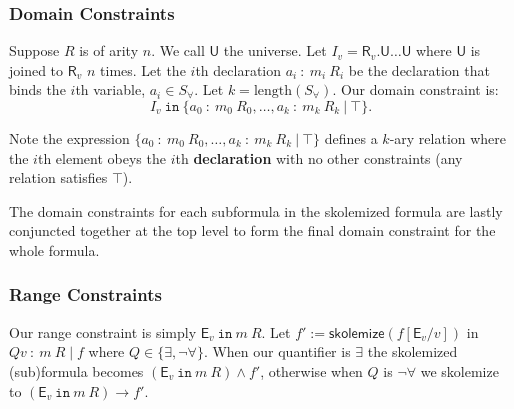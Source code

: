 \documentclass{article}
\theoremstyle{definition}
\begin{document}
    \subsubsection*{Domain Constraints}

    Suppose $R$ is of arity $n$. We call $\textsf{U}$ the universe. Let $I_v = \textsf{R}_v.\textsf{U} \dots \textsf{U}$ where $\textsf{U}$ is joined to $\textsf{R}_v$ $n$ times. Let the $i$th declaration $a_i~:~m_i~R_i$ be the declaration that binds the $i$th variable, $a_i \in S_\forall$. Let $k = \text{length}(S_\forall)$. Our domain constraint is:
    $$I_v ~ \texttt{in} ~ \{a_0~:~m_0~R_0, \dots, a_k~:~m_k~R_k~\vert~\top\}.$$

    Note the expression $\{a_0~:~m_0~R_0, \dots, a_k~:~m_k~R_k~\vert~\top\}$ defines a $k$-ary relation where the $i$th element obeys the $i$th \textbf{declaration} with no other constraints (any relation satisfies $\top$).

    The domain constraints for each subformula in the skolemized formula are lastly conjuncted together at the top level to form the final domain constraint for the whole formula.



    \subsubsection*{Range Constraints}
    Our range constraint is simply $\textsf{E}_v ~\texttt{in}~ m~R$. Let $f' := \textsf{skolemize}(f[\textsf{E}_v / v])$ in $Qv~:~m~R \mid f$ where $Q \in \{\exists, \neg \forall\}$. When our quantifier is $\exists$ the skolemized (sub)formula becomes $(\textsf{E}_v~\texttt{in}~ m~ R) \land f'$, otherwise when $Q$ is $\neg \forall$ we skolemize to $(\textsf{E}_v ~\texttt{in}~ m~R) \to f'$.
\end{document}
